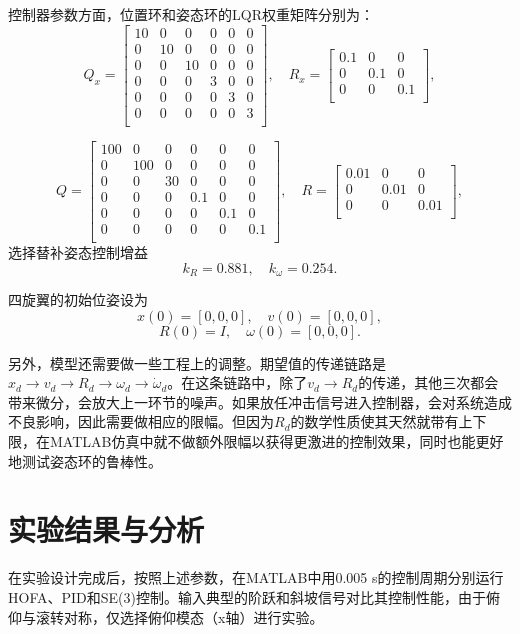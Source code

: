 控制器参数方面，位置环和姿态环的LQR权重矩阵分别为：
$$Q_x=\begin{bmatrix}
  10&0&0&0&0&0\\
  0&10&0&0&0&0\\
  0&0&10&0&0&0\\
  0&0&0&3&0&0\\
  0&0&0&0&3&0\\
  0&0&0&0&0&3\\
\end{bmatrix}, \quad R_x=\begin{bmatrix}
  0.1 &0 &0\\
  0 &0.1 &0\\
  0 &0 &0.1\\
\end{bmatrix},$$

$$Q=\begin{bmatrix}
  100&0&0&0&0&0\\
  0&100&0&0&0&0\\
  0&0&30&0&0&0\\
  0&0&0&0.1&0&0\\
  0&0&0&0&0.1&0\\
  0&0&0&0&0&0.1\\
\end{bmatrix}, \quad R=\begin{bmatrix}
  0.01 &0 &0\\
  0 &0.01 &0\\
  0 &0 &0.01\\
\end{bmatrix},$$
选择替补姿态控制增益
$$k_R=0.881 ,\quad k_\omega=0.254.$$

四旋翼的初始位姿设为
$$x(0)=[0,0,0],\quad v(0)=[0,0,0],$$
$$R(0)=I , \quad \omega(0)=[0,0,0].$$

另外，模型还需要做一些工程上的调整。期望值的传递链路是$x_d \to v_d \to R_d \to \omega_d \to \dot \omega_d$。在这条链路中，除了$ v_d \to R_d$的传递，其他三次都会带来微分，会放大上一环节的噪声。如果放任冲击信号进入控制器，会对系统造成不良影响，因此需要做相应的限幅。但因为$R_d$的数学性质使其天然就带有上下限，在MATLAB仿真中就不做额外限幅以获得更激进的控制效果，同时也能更好地测试姿态环的鲁棒性。

\section{实验结果与分析}

  在实验设计完成后，按照上述参数，在MATLAB中用0.005 s的控制周期分别运行HOFA、PID和SE(3)控制。输入典型的阶跃和斜坡信号对比其控制性能，由于俯仰与滚转对称，仅选择俯仰模态（x轴）进行实验。

